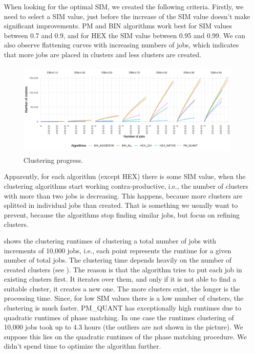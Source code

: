 \documentclass[]{llncs}
\begin{document}
When looking for the optimal SIM, we created the following criteria.
Firstly, we need to select a SIM value, just before the increase of the SIM value doesn't make significant improvements.
PM and BIN algorithms work best for SIM values between 0.7 and 0.9, and for HEX the SIM value between 0.95 and 0.99.
We can also observe flattening curves with increasing numbers of jobs, which indicates that more jobs are placed in clusters and less clusters are created.


\begin{figure}
  \centering
   \includegraphics[width=4.61in,height=1.85in]{./media/image15.png}
   \caption{Clustering progress.}
   \label{fig:clustering_progress}
\end{figure}



Apparently, for each algorithm (except HEX) there is some SIM value, when the clustering algorithms start working contra-productive, i.e., the number of clusters with more than two jobs is decreasing.
This happens, because more clusters are splitted in individual jobs than created.
That is something we usually want to prevent, because the algorithms stop finding similar jobs, but focus on refining clusters.

 shows the clustering runtimes of clustering a total number of jobs with increments of 10,000 jobs, i.e., each point represents the runtime for a given number of total jobs.
The clustering time depends heavily on the number of created clusters (see ).
The reason is that the algorithm tries to put each job in existing clusters first.
It iterates over them, and only if it is not able to find a suitable cluster, it creates a new one.
The more clusters exist, the longer is the processing time.
Since, for low SIM values there is a low number of clusters, the clustering is much faster.
PM\_QUANT has exceptionally high runtimes due to quadratic runtimes of phase matching.
In one case the runtimes clustering of 10,000 jobs took up to 4.3 hours (the outliers are not shown in the picture).
We suppose this lies on the quadratic runtimes of the phase matching procedure.
We didn't spend time to optimize the algorithm further.
\end{document}
